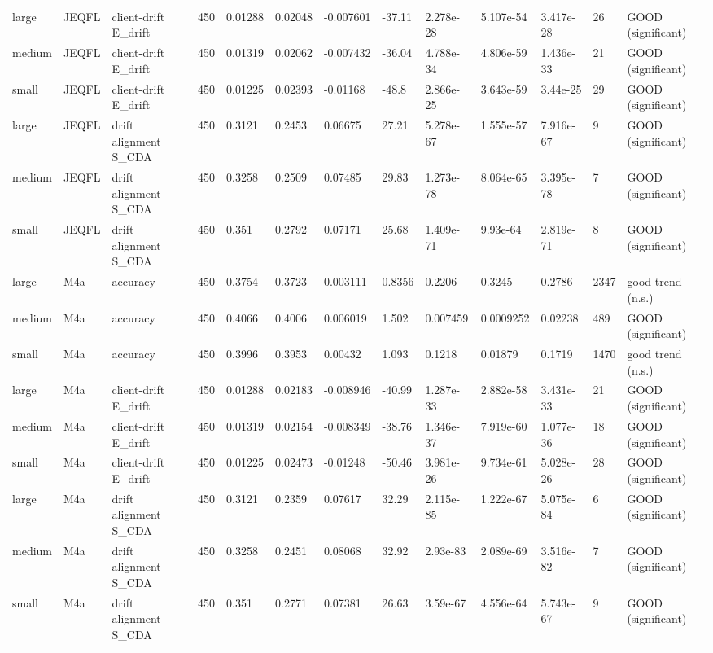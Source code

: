 \begin{table}[t]
\begin{tabular}{lllllllllllll}
large & JEQFL & client-drift E\_drift & 450 & 0.01288 & 0.02048 & -0.007601 & -37.11 & 2.278e-28 & 5.107e-54 & 3.417e-28 & 26 & GOOD (significant) \\
medium & JEQFL & client-drift E\_drift & 450 & 0.01319 & 0.02062 & -0.007432 & -36.04 & 4.788e-34 & 4.806e-59 & 1.436e-33 & 21 & GOOD (significant) \\
small & JEQFL & client-drift E\_drift & 450 & 0.01225 & 0.02393 & -0.01168 & -48.8 & 2.866e-25 & 3.643e-59 & 3.44e-25 & 29 & GOOD (significant) \\
large & JEQFL & drift alignment S\_CDA & 450 & 0.3121 & 0.2453 & 0.06675 & 27.21 & 5.278e-67 & 1.555e-57 & 7.916e-67 & 9 & GOOD (significant) \\
medium & JEQFL & drift alignment S\_CDA & 450 & 0.3258 & 0.2509 & 0.07485 & 29.83 & 1.273e-78 & 8.064e-65 & 3.395e-78 & 7 & GOOD (significant) \\
small & JEQFL & drift alignment S\_CDA & 450 & 0.351 & 0.2792 & 0.07171 & 25.68 & 1.409e-71 & 9.93e-64 & 2.819e-71 & 8 & GOOD (significant) \\
large & M4a & accuracy & 450 & 0.3754 & 0.3723 & 0.003111 & 0.8356 & 0.2206 & 0.3245 & 0.2786 & 2347 & good trend (n.s.) \\
medium & M4a & accuracy & 450 & 0.4066 & 0.4006 & 0.006019 & 1.502 & 0.007459 & 0.0009252 & 0.02238 & 489 & GOOD (significant) \\
small & M4a & accuracy & 450 & 0.3996 & 0.3953 & 0.00432 & 1.093 & 0.1218 & 0.01879 & 0.1719 & 1470 & good trend (n.s.) \\
large & M4a & client-drift E\_drift & 450 & 0.01288 & 0.02183 & -0.008946 & -40.99 & 1.287e-33 & 2.882e-58 & 3.431e-33 & 21 & GOOD (significant) \\
medium & M4a & client-drift E\_drift & 450 & 0.01319 & 0.02154 & -0.008349 & -38.76 & 1.346e-37 & 7.919e-60 & 1.077e-36 & 18 & GOOD (significant) \\
small & M4a & client-drift E\_drift & 450 & 0.01225 & 0.02473 & -0.01248 & -50.46 & 3.981e-26 & 9.734e-61 & 5.028e-26 & 28 & GOOD (significant) \\
large & M4a & drift alignment S\_CDA & 450 & 0.3121 & 0.2359 & 0.07617 & 32.29 & 2.115e-85 & 1.222e-67 & 5.075e-84 & 6 & GOOD (significant) \\
medium & M4a & drift alignment S\_CDA & 450 & 0.3258 & 0.2451 & 0.08068 & 32.92 & 2.93e-83 & 2.089e-69 & 3.516e-82 & 7 & GOOD (significant) \\
small & M4a & drift alignment S\_CDA & 450 & 0.351 & 0.2771 & 0.07381 & 26.63 & 3.59e-67 & 4.556e-64 & 5.743e-67 & 9 & GOOD (significant) \\

\end{tabular}
\end{table}
